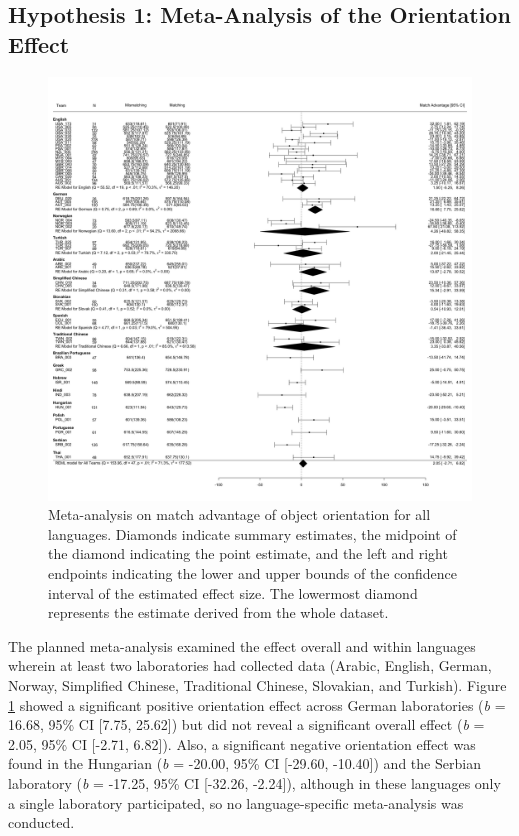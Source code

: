 \documentclass[
  man,floatsintext]{apa7}
\begin{document}
\hypertarget{hypothesis-1-meta-analysis-of-the-orientation-effect}{%
\subsection{Hypothesis 1: Meta-Analysis of the Orientation Effect}\label{hypothesis-1-meta-analysis-of-the-orientation-effect}}

\begin{figure}
\includegraphics[width=1\linewidth,height=0.9\textheight]{includes/fig/meta-all} \caption{Meta-analysis on match advantage of object orientation for all languages. Diamonds indicate summary estimates, the midpoint of the diamond indicating the point estimate, and the left and right endpoints indicating the lower and upper bounds of the confidence interval of the estimated effect size. The lowermost diamond represents the estimate derived from the whole dataset.}\label{fig:meta-all-plot}
\end{figure}

The planned meta-analysis examined the effect overall and within
languages wherein at least two laboratories had collected data (Arabic,
English, German, Norway, Simplified Chinese, Traditional Chinese,
Slovakian, and Turkish). Figure \ref{fig:meta-all-plot} showed a
significant positive orientation effect across German laboratories (\emph{b}
= 16.68, 95\% CI
{[}7.75,
25.62{]}) but did not reveal a
significant overall effect (\emph{b} =
2.05, 95\% CI
{[}-2.71,
6.82{]}). Also, a significant
negative orientation effect was found in the Hungarian (\emph{b} = -20.00,
95\% CI {[}-29.60, -10.40{]}) and the Serbian laboratory (\emph{b} = -17.25, 95\%
CI {[}-32.26, -2.24{]}), although in these languages only a single
laboratory participated, so no language-specific meta-analysis was
conducted.
\end{document}
